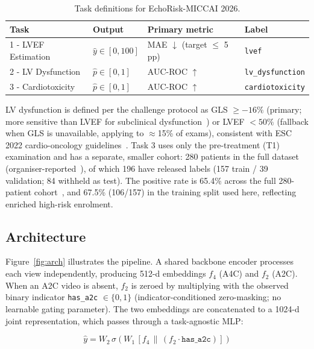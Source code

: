 \documentclass[runningheads]{llncs}
\begin{document}
\begin{table}[t]
\caption{Task definitions for EchoRisk-MICCAI 2026.}\label{tab:tasks}
\centering
\begin{tabular}{llll}
\toprule
Task & Output & Primary metric & Label \\
\midrule
1 - LVEF Estimation & $\hat{y} \in [0,100]$ & MAE $\downarrow$ (target $\le$ 5 pp) & \texttt{lvef} \\
2 - LV Dysfunction & $\hat{p} \in [0,1]$ & AUC-ROC $\uparrow$ & \texttt{lv\_dysfunction} \\
3 - Cardiotoxicity & $\hat{p} \in [0,1]$ & AUC-ROC $\uparrow$ & \texttt{cardiotoxicity} \\
\bottomrule
\end{tabular}
\end{table}

LV dysfunction is defined per the challenge protocol as GLS $\ge -16\%$ (primary; more sensitive than LVEF for subclinical dysfunction~\cite{ref_echorisk}) or LVEF $<50\%$ (fallback when GLS is unavailable, applying to $\approx$15\% of exams), consistent with ESC 2022 cardio-oncology guidelines~\cite{ref_esc2022}. Task 3 uses only the pre-treatment (T1) examination and has a separate, smaller cohort: 280 patients in the full dataset (organiser-reported~\cite{ref_echorisk}), of which 196 have released labels (157 train / 39 validation; 84 withheld as test). The positive rate is 65.4\% across the full 280-patient cohort~\cite{ref_echorisk}, and 67.5\% (106/157) in the training split used here, reflecting enriched high-risk enrolment.

\subsection{Architecture}

Figure~\ref{fig:arch} illustrates the pipeline. A shared backbone encoder processes each view independently, producing 512-d embeddings $f_4$ (A4C) and $f_2$ (A2C). When an A2C video is absent, $f_2$ is zeroed by multiplying with the observed binary indicator \texttt{has\_a2c} $\in \{0,1\}$ (indicator-conditioned zero-masking; no learnable gating parameter). The two embeddings are concatenated to a 1024-d joint representation, which passes through a task-agnostic MLP:

\begin{equation}
  \hat{y} = W_2\,\sigma\!\left(W_1\,[f_4 \,\|\, (f_2 \cdot \texttt{has\_a2c})]\right)
\end{equation}
\end{document}
